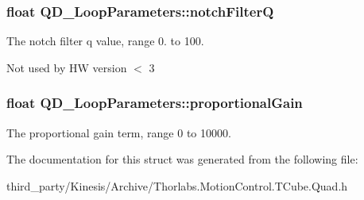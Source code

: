 \subsubsection[{\texorpdfstring{notch\+FilterQ}{notchFilterQ}}]{\setlength{\rightskip}{0pt plus 5cm}float Q\+D\+\_\+\+Loop\+Parameters\+::notch\+FilterQ}\hypertarget{struct_q_d___loop_parameters_a6686ff851386546ba108ec42c73769e7}{}\label{struct_q_d___loop_parameters_a6686ff851386546ba108ec42c73769e7}


The notch filter q value, range 0. to 100. 

Not used by HW version $<$ 3
\subsubsection[{\texorpdfstring{proportional\+Gain}{proportionalGain}}]{\setlength{\rightskip}{0pt plus 5cm}float Q\+D\+\_\+\+Loop\+Parameters\+::proportional\+Gain}\hypertarget{struct_q_d___loop_parameters_ad3c022f266ac6853931939ba030f402b}{}\label{struct_q_d___loop_parameters_ad3c022f266ac6853931939ba030f402b}


The proportional gain term, range 0 to 10000. 



The documentation for this struct was generated from the following file\+:\begin{DoxyCompactItemize}
\item 
third\+\_\+party/\+Kinesis/\+Archive/Thorlabs.\+Motion\+Control.\+T\+Cube.\+Quad.\+h\end{DoxyCompactItemize}
